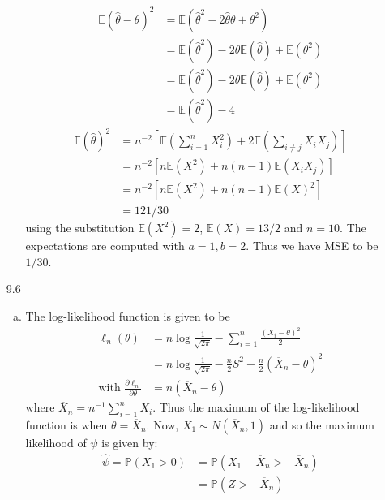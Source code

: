 \documentclass[a4paper,10pt]{article}
\theoremstyle{definition}
\begin{document}
\begin{enumerate}
\begin{enumerate}[(a)]
\begin{align*}
\mathbb{E}(\hat{\theta}-\theta)^2&=\mathbb{E}(\hat{\theta}^2-2\hat{\theta}\theta+\theta^2)\\
&=\mathbb{E}(\hat{\theta}^2)-2\theta\mathbb{E}(\hat{\theta})+\mathbb{E}(\theta^2)\\
&=\mathbb{E}(\hat{\theta}^2)-2\theta\mathbb{E}(\hat{\theta})+\mathbb{E}(\theta^2)\\
&=\mathbb{E}(\hat{\theta}^2)-4
\end{align*}
\begin{align*}
\mathbb{E}(\hat{\theta})^2&=n^{-2}\left[\mathbb{E}\left(\sum_{i=1}^{n}X_i^2\right)+2\mathbb{E}\left(\sum_{i\neq j}X_iX_j\right)\right]\\
&=n^{-2}\left[n\mathbb{E}\left(X^2\right)+n(n-1)\mathbb{E}\left(X_iX_j\right)\right]\\
&=n^{-2}\left[n\mathbb{E}\left(X^2\right)+n(n-1)\mathbb{E}\left(X\right)^2\right]\\
&=121/30
\end{align*}
using the substitution $\mathbb{E}(X^2) = 2 $, $\mathbb{E}(X) = 13/2$ and $n=10$. The expectations are computed with $a=1, b=2$. Thus we have {\sffamily MSE} to be $1/30$.
\end{enumerate}
\item[9.6] 
\begin{enumerate}[(a)]
\item The log-likelihood function is given to be
\begin{align*}
\ell_n(\theta)&=n\log\frac{1}{\sqrt{2\pi}}-\sum_{i=1}^{n}\frac{(X_i-\theta)^2}{2}\\
&=n\log\frac{1}{\sqrt{2\pi}}-\frac{n}{2}S^2-\frac{n}{2}(\overline{X}_n-\theta)^2\\
\text{with } \frac{\partial \ell_n}{\partial \theta}&=n(\overline{X}_n-\theta)
\end{align*}
where $\overline{X}_n = n^{-1}\sum_{i=1}^{n} X_i$. Thus the maximum of the log-likelihood function is when $\theta = \overline{X}_n$. Now, $X_1 \sim N(\overline{X}_n,1)$ and so the maximum likelihood of $\psi$ is given by:
\begin{align*}
\hat{\psi} = \mathbb{P}(X_1 >0) &= \mathbb{P}\left(X_1 -\overline{X}_n > -\overline{X}_n\right)\\
&= \mathbb{P}\left( Z> -\overline{X}_n\right)\\
\end{align*}

\end{enumerate}
\end{enumerate}
\end{document}
